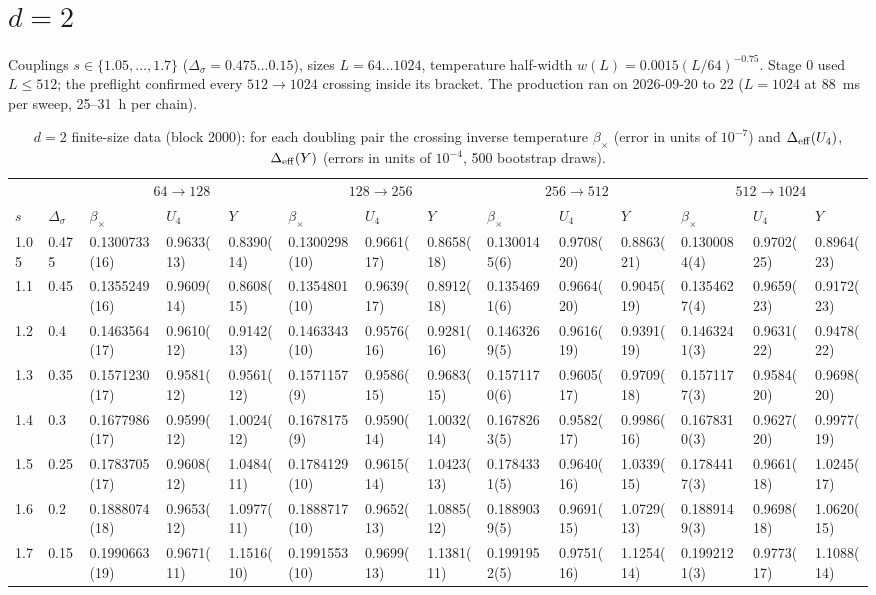\documentclass[10pt,a4paper]{article}
\newcommand{\Ds}{\Delta_\sigma}
\newcommand{\Deff}{\Delta_{\rm eff}}
\begin{document}
\section{\texorpdfstring{$d=2$}{d=2}}\label{sec:2d}
Couplings $s\in\{1.05,\dots,1.7\}$ ($\Ds=0.475\dots0.15$), sizes $L=64\dots1024$, temperature half-width $w(L)=0.0015(L/64)^{-0.75}$. Stage 0 used
$L\le512$; the preflight confirmed every $512\to1024$ crossing inside its bracket. The production ran on 2026-09-20 to 22 ($L=1024$ at 88~ms per
sweep, 25--31~h per chain).
\begin{table}\centering\scriptsize
\caption{$d=2$ finite-size data (block 2000): for each doubling pair the crossing inverse temperature $\beta_\times$ (error in units of $10^{-7}$) and
$\Deff(U_4)$, $\Deff(Y)$ (errors in units of $10^{-4}$, 500 bootstrap draws).}\label{tab:2dpairs}
\begin{tabular}{@{}ll|lll|lll|lll|lll@{}}\toprule
 & & \multicolumn{3}{c|}{$64\to128$} & \multicolumn{3}{c|}{$128\to256$} & \multicolumn{3}{c|}{$256\to512$} & \multicolumn{3}{c}{$512\to1024$}\\
$s$ & $\Ds$ & $\beta_\times$ & $U_4$ & $Y$ & $\beta_\times$ & $U_4$ & $Y$ & $\beta_\times$ & $U_4$ & $Y$ & $\beta_\times$ & $U_4$ & $Y$ \\\midrule
1.05 & 0.475 & 0.1300733(16) & 0.9633(13) & 0.8390(14) & 0.1300298(10) & 0.9661(17) & 0.8658(18) & 0.1300145(6) & 0.9708(20) & 0.8863(21) & 0.1300084(4) & 0.9702(25) & 0.8964(23) \\
1.1 & 0.45 & 0.1355249(16) & 0.9609(14) & 0.8608(15) & 0.1354801(10) & 0.9639(17) & 0.8912(18) & 0.1354691(6) & 0.9664(20) & 0.9045(19) & 0.1354627(4) & 0.9659(23) & 0.9172(23) \\
1.2 & 0.4 & 0.1463564(17) & 0.9610(12) & 0.9142(13) & 0.1463343(10) & 0.9576(16) & 0.9281(16) & 0.1463269(5) & 0.9616(19) & 0.9391(19) & 0.1463241(3) & 0.9631(22) & 0.9478(22) \\
1.3 & 0.35 & 0.1571230(17) & 0.9581(12) & 0.9561(12) & 0.1571157(9) & 0.9586(15) & 0.9683(15) & 0.1571170(6) & 0.9605(17) & 0.9709(18) & 0.1571177(3) & 0.9584(20) & 0.9698(20) \\
1.4 & 0.3 & 0.1677986(17) & 0.9599(12) & 1.0024(12) & 0.1678175(9) & 0.9590(14) & 1.0032(14) & 0.1678263(5) & 0.9582(17) & 0.9986(16) & 0.1678310(3) & 0.9627(20) & 0.9977(19) \\
1.5 & 0.25 & 0.1783705(17) & 0.9608(12) & 1.0484(11) & 0.1784129(10) & 0.9615(14) & 1.0423(13) & 0.1784331(5) & 0.9640(16) & 1.0339(15) & 0.1784417(3) & 0.9661(18) & 1.0245(17) \\
1.6 & 0.2 & 0.1888074(18) & 0.9653(12) & 1.0977(11) & 0.1888717(10) & 0.9652(13) & 1.0885(12) & 0.1889039(5) & 0.9691(15) & 1.0729(13) & 0.1889149(3) & 0.9698(18) & 1.0620(15) \\
1.7 & 0.15 & 0.1990663(19) & 0.9671(11) & 1.1516(10) & 0.1991553(10) & 0.9699(13) & 1.1381(11) & 0.1991952(5) & 0.9751(16) & 1.1254(14) & 0.1992121(3) & 0.9773(17) & 1.1088(14) \\
\bottomrule\end{tabular}
\end{table}
\end{document}
